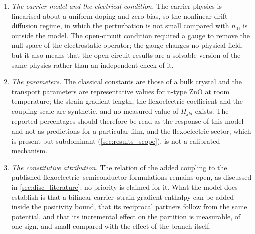 \begin{enumerate}
scattering result does not rest on it.  The same measurements settle what the
earlier band-energy argument could not: the strain-gradient energy in the outer
band $|z|>0.4\,d/2$ is $0.93$--$1.00$~\% of the total at the operating point,
$1.22$--$1.30$~\% at the maximum and $1.18$--$1.26$~\% at $k_xd=0.55$, and its
share decreases with degree, but the band average of the mixed hyperstress
exceeds the pointwise corner value by factors of five to ten, so no band average
is used here to argue the corner datum away.
\item \emph{The carrier model and the electrical condition.}  The carrier
physics is linearised about a uniform doping and zero bias, so the nonlinear
drift--diffusion regime, in which the perturbation is not small compared with
$n_0$, is outside the model.  The open-circuit condition required a gauge to
remove the null space of the electrostatic operator; the gauge changes no
physical field, but it also means that the open-circuit results are a solvable
version of the same physics rather than an independent check of it.
\item \emph{The parameters.}  The classical constants are those of a bulk
crystal and the transport parameters are representative values for n-type ZnO at
room temperature; the strain-gradient length, the flexoelectric coefficient and
the coupling scale are synthetic, and no measured value of $H_{jkl}$ exists.
The reported percentages should therefore be read as the response of this model
and not as predictions for a particular film, and the flexoelectric sector, which
is present but subdominant (\cref{sec:results_scope}), is not a calibrated
mechanism.
\item \emph{The constitutive attribution.}  The relation of the added coupling
to the published flexoelectric--semiconductor formulations remains open, as
discussed in \cref{sec:disc_literature}; no priority is claimed for it.  What the
model does establish is that a bilinear carrier--strain-gradient enthalpy can be
added inside the positivity bound, that its reciprocal partners follow from the
same potential, and that its incremental effect on the partition is measurable,
of one sign, and small compared with the effect of the branch itself.
\end{enumerate}
